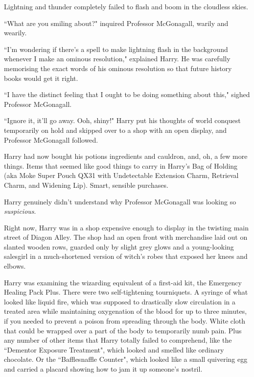 Lightning and thunder completely failed to flash and boom in the cloudless skies.

``What are you smiling about?" inquired Professor McGonagall, warily and wearily.

``I'm wondering if there's a spell to make lightning flash in the background whenever I make an ominous resolution," explained Harry. He was carefully memorising the exact words of his ominous resolution so that future history books would get it right.

``I have the distinct feeling that I ought to be doing something about this," sighed Professor McGonagall.

``Ignore it, it'll go away. Ooh, shiny!" Harry put his thoughts of world conquest temporarily on hold and skipped over to a shop with an open display, and Professor McGonagall followed.

\later

Harry had now bought his potions ingredients and cauldron, and, oh, a few more things. Items that seemed like good things to carry in Harry's Bag of Holding (aka Moke Super Pouch QX31 with Undetectable Extension Charm, Retrieval Charm, and Widening Lip). Smart, sensible purchases.

Harry genuinely didn't understand why Professor McGonagall was looking so \emph{suspicious}.

Right now, Harry was in a shop expensive enough to display in the twisting main street of Diagon Alley. The shop had an open front with merchandise laid out on slanted wooden rows, guarded only by slight grey glows and a young-looking salesgirl in a much-shortened version of witch's robes that exposed her knees and elbows.

Harry was examining the wizarding equivalent of a first-aid kit, the Emergency Healing Pack Plus. There were two self-tightening tourniquets. A syringe of what looked like liquid fire, which was supposed to drastically slow circulation in a treated area while maintaining oxygenation of the blood for up to three minutes, if you needed to prevent a poison from spreading through the body. White cloth that could be wrapped over a part of the body to temporarily numb pain. Plus any number of other items that Harry totally failed to comprehend, like the ``Dementor Exposure Treatment", which looked and smelled like ordinary chocolate. Or the ``Bafflesnaffle Counter", which looked like a small quivering egg and carried a placard showing how to jam it up someone's nostril.

